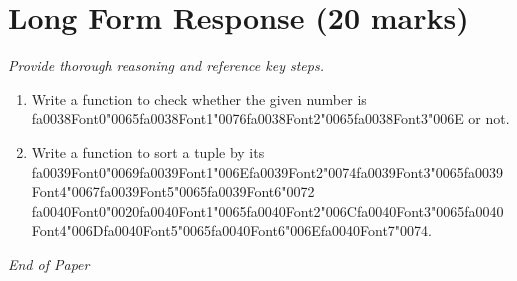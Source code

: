 \documentclass[12pt]{article}
\begin{document}
\section*{Long Form Response (20 marks)}
\textit{Provide thorough reasoning and reference key steps.}
\begin{enumerate}[label=\arabic*.]
\item Write a function to check whether the given number is {\csname fa0038Font0\endcsname\char"0065}{\csname fa0038Font1\endcsname\char"0076}{\csname fa0038Font2\endcsname\char"0065}{\csname fa0038Font3\endcsname\char"006E} or not.
\item Write a function to sort a tuple by its {\csname fa0039Font0\endcsname\char"0069}{\csname fa0039Font1\endcsname\char"006E}{\csname fa0039Font2\endcsname\char"0074}{\csname fa0039Font3\endcsname\char"0065}{\csname fa0039Font4\endcsname\char"0067}{\csname fa0039Font5\endcsname\char"0065}{\csname fa0039Font6\endcsname\char"0072} {\csname fa0040Font0\endcsname\char"0020}{\csname fa0040Font1\endcsname\char"0065}{\csname fa0040Font2\endcsname\char"006C}{\csname fa0040Font3\endcsname\char"0065}{\csname fa0040Font4\endcsname\char"006D}{\csname fa0040Font5\endcsname\char"0065}{\csname fa0040Font6\endcsname\char"006E}{\csname fa0040Font7\endcsname\char"0074}.
\end{enumerate}

\vfill
\noindent\textit{End of Paper}
\end{document}
